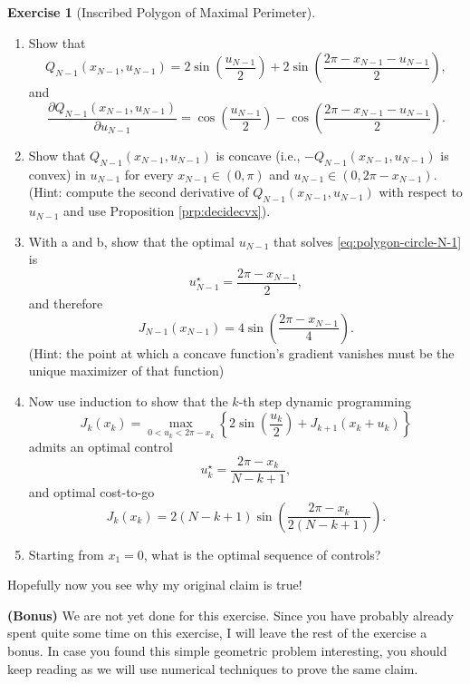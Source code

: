\documentclass[
]{book}
\theoremstyle{definition}
\theoremstyle{definition}
\theoremstyle{definition}
\newtheorem{exercise}{Exercise}[chapter]
\theoremstyle{definition}
\theoremstyle{remark}
\begin{document}
\begin{exercise}[Inscribed Polygon of Maximal Perimeter]
\begin{enumerate}
\def\labelenumi{\alph{enumi}.}
\item
  Show that
  \[
  Q_{N-1}(x_{N-1},u_{N-1}) = 2 \sin \left(  \frac{u_{N-1}}{2} \right) + 2 \sin \left(  \frac{2\pi - x_{N-1} - u_{N-1} }{2} \right),
  \]
  and
  \[
  \frac{\partial Q_{N-1}(x_{N-1},u_{N-1})}{\partial u_{N-1}} = \cos \left(  \frac{u_{N-1}}{2} \right) -  \cos \left(  \frac{2\pi - x_{N-1} - u_{N-1} }{2} \right).
  \]
\item
  Show that \(Q_{N-1}(x_{N-1},u_{N-1})\) is concave (i.e., \(-Q_{N-1}(x_{N-1},u_{N-1})\) is convex) in \(u_{N-1}\) for every \(x_{N-1} \in (0, \pi)\) and \(u_{N-1} \in (0, 2\pi - x_{N-1})\). (Hint: compute the second derivative of \(Q_{N-1}(x_{N-1},u_{N-1})\) with respect to \(u_{N-1}\) and use Proposition \ref{prp:decidecvx}).
\item
  With a and b, show that the optimal \(u_{N-1}\) that solves \eqref{eq:polygon-circle-N-1} is
  \[
  u_{N-1}^\star = \frac{2\pi - x_{N-1}}{2},
  \]
  and therefore
  \[
  J_{N-1}(x_{N-1}) = 4 \sin \left( \frac{2\pi - x_{N-1}}{4} \right).
  \]
  (Hint: the point at which a concave function's gradient vanishes must be the unique maximizer of that function)
\item
  Now use induction to show that the \(k\)-th step dynamic programming
  \[
  J_k(x_k) = \max_{0< u_k < 2\pi - x_k} \left\{ 2 \sin\left( \frac{u_k}{2} \right) + J_{k+1}(x_k + u_k) \right\}
  \]
  admits an optimal control
  \[
  u_k^\star = \frac{2\pi - x_k}{N-k+1},
  \]
  and optimal cost-to-go
  \[
  J_k(x_k) = 2(N-k+1)\sin\left( \frac{2\pi - x_k}{2(N-k+1)} \right).
  \]
\item
  Starting from \(x_1 = 0\), what is the optimal sequence of controls?
\end{enumerate}

Hopefully now you see why my original claim is true!

\textbf{(Bonus)} We are not yet done for this exercise. Since you have probably already spent quite some time on this exercise, I will leave the rest of the exercise a bonus. In case you found this simple geometric problem interesting, you should keep reading as we will use numerical techniques to prove the same claim.


\end{exercise}
\end{document}
